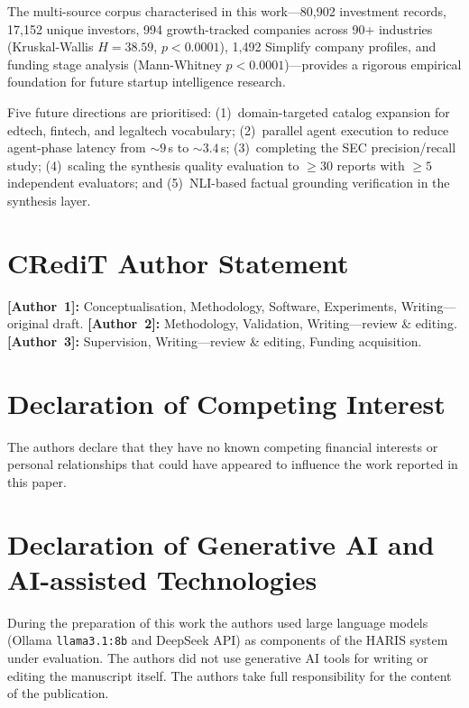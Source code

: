 \documentclass[preprint,12pt]{elsarticle}
\begin{document}
The multi-source corpus characterised in this work---80,902 investment records,
17,152 unique investors, 994 growth-tracked companies across 90+ industries
(Kruskal-Wallis $H{=}38.59$, $p{<}0.0001$), 1,492 Simplify company profiles, and
funding stage analysis (Mann-Whitney $p{<}0.0001$)---provides a rigorous
empirical foundation for future startup intelligence research.

Five future directions are prioritised: (1)~domain-targeted catalog expansion for
edtech, fintech, and legaltech vocabulary; (2)~parallel agent execution to reduce
agent-phase latency from ${\sim}9$\,s to ${\sim}3.4$\,s; (3)~completing the SEC
precision/recall study; (4)~scaling the synthesis quality evaluation to $\ge 30$
reports with $\ge 5$ independent evaluators; and (5)~NLI-based factual grounding
verification in the synthesis layer.


\section*{CRediT Author Statement}

\textbf{[Author~1]:} Conceptualisation, Methodology, Software, Experiments,
Writing---original draft.
\textbf{[Author~2]:} Methodology, Validation, Writing---review \& editing.
\textbf{[Author~3]:} Supervision, Writing---review \& editing, Funding acquisition.

\section*{Declaration of Competing Interest}

The authors declare that they have no known competing financial interests or
personal relationships that could have appeared to influence the work reported in
this paper.

\section*{Declaration of Generative AI and AI-assisted Technologies}

During the preparation of this work the authors used large language models (Ollama
\texttt{llama3.1:8b} and DeepSeek API) as components of the HARIS system under
evaluation. The authors did not use generative AI tools for writing or editing the
manuscript itself. The authors take full responsibility for the content of the
publication.
\end{document}
